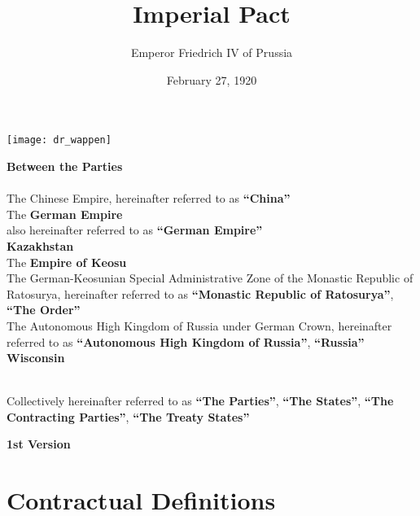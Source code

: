 \documentclass{article}
\title{Imperial Pact}
\author{Emperor Friedrich IV of Prussia}
\date{February 27, 1920}
\begin{document}
\maketitle
\begin{center}
    \texttt{[image: dr\_wappen]}
\end{center}
\begin{center}
    \textbf{Between the Parties\\}\textbf{\\}
    The Chinese Empire, hereinafter referred to as \textbf{``China''\\}
    The \textbf{German Empire\\} also hereinafter referred to as \textbf{``German Empire''\\}
    \textbf{Kazakhstan\\}
    The \textbf{Empire of Keosu\\}
    The German-Keosunian Special Administrative Zone of the Monastic Republic of Ratosurya, hereinafter referred to as \textbf{``Monastic Republic of Ratosurya''}, \textbf{``The Order''\\}
    The Autonomous High Kingdom of Russia under German Crown, hereinafter referred to as \textbf{``Autonomous High Kingdom of Russia''}, \textbf{``Russia''\\}
    \textbf{Wisconsin\\}
    \textbf{\\}

    Collectively hereinafter referred to as \textbf{``The Parties''}, \textbf{``The States''}, \textbf{``The Contracting Parties''}, \textbf{``The Treaty States''}
\end{center}
\newpage
{}
\vspace*{\fill}
\begin{Center}
\textbf{1st Version}
\vspace*{\fill}
\end{Center}
\newpage
\tableofcontents
\newpage
\section{Contractual Definitions}
\end{document}
